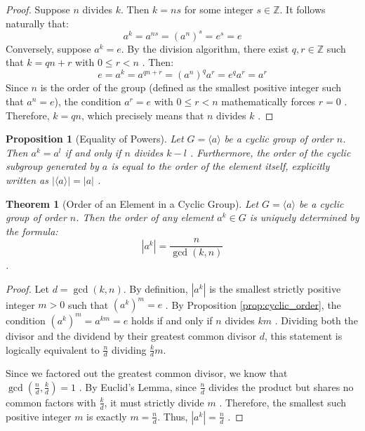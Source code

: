 \documentclass[11pt]{article}
\theoremstyle{definition}
\theoremstyle{plain}
\newtheorem{theorem}{Theorem}[section]
\newtheorem{proposition}{Proposition}[theorem]
\theoremstyle{remark}
\begin{document}
\begin{proof}
Suppose $n$ divides $k$. Then $k = ns$ for some integer $s \in \mathbb{Z}$. It follows naturally that:
\begin{equation}
    a^k = a^{ns} = (a^n)^s = e^s = e
\end{equation}
Conversely, suppose $a^k = e$. By the division algorithm, there exist $q, r \in \mathbb{Z}$ such that $k = qn + r$ with $0 \le r < n$ \cite{dummit}. Then:
\begin{equation}
    e = a^k = a^{qn + r} = (a^n)^q a^r = e^q a^r = a^r
\end{equation}
Since $n$ is the order of the group (defined as the smallest positive integer such that $a^n = e$), the condition $a^r = e$ with $0 \le r < n$ mathematically forces $r = 0$ \cite{gallian}. Therefore, $k = qn$, which precisely means that $n$ divides $k$ \cite{fraleigh}.
\end{proof}

\begin{proposition}[Equality of Powers]
Let $G = \langle a \rangle$ be a cyclic group of order $n$. Then $a^k = a^l$ if and only if $n$ divides $k - l$ \cite{gallian}. Furthermore, the order of the cyclic subgroup generated by $a$ is equal to the order of the element itself, explicitly written as $|\langle a \rangle| = |a|$ \cite{dummit}.
\end{proposition}

\begin{theorem}[Order of an Element in a Cyclic Group] \label{thm:order_power}
Let $G = \langle a \rangle$ be a cyclic group of order $n$. Then the order of any element $a^k \in G$ is uniquely determined by the formula:
\begin{equation}
    |a^k| = \frac{n}{\gcd(k, n)}
\end{equation}
\cite{fraleigh}.
\end{theorem}

\begin{proof}
Let $d = \gcd(k, n)$. By definition, $|a^k|$ is the smallest strictly positive integer $m > 0$ such that $(a^k)^m = e$ \cite{dummit}. 
By Proposition \ref{prop:cyclic_order}, the condition $(a^k)^m = a^{km} = e$ holds if and only if $n$ divides $km$ \cite{gallian}. 
Dividing both the divisor and the dividend by their greatest common divisor $d$, this statement is logically equivalent to $\frac{n}{d}$ dividing $\frac{k}{d}m$. 

Since we factored out the greatest common divisor, we know that $\gcd(\frac{n}{d}, \frac{k}{d}) = 1$ \cite{fraleigh}. 
By Euclid's Lemma, since $\frac{n}{d}$ divides the product but shares no common factors with $\frac{k}{d}$, it must strictly divide $m$ \cite{dummit}. 
Therefore, the smallest such positive integer $m$ is exactly $m = \frac{n}{d}$. Thus, $|a^k| = \frac{n}{d}$ \cite{gallian}.
\end{proof}
\end{document}
